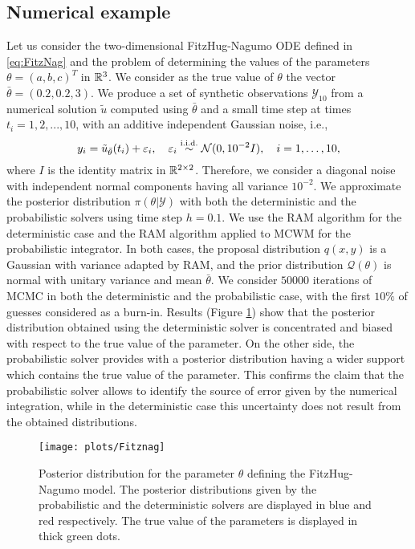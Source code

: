 \subsection{Numerical example}
Let us consider the two-dimensional FitzHug-Nagumo ODE defined in \eqref{eq:FitzNag} and the problem of determining the values of the parameters $\theta = (a, b, c)^T$ in $\mathbb{R}^3$. We consider as the true value of $\theta$ the vector $\bar \theta = (0.2, 0.2, 3)$. We produce a set of synthetic observations $\mathcal{Y}_{10}$ from a numerical solution $\tilde u$ computed using $\bar \theta$ and a small time step at times $t_i = 1, 2, ..., 10$, with an additive independent Gaussian noise, i.e.,
\begin{equation}
	y_i = \tilde u_{\bar\theta}(t_i) + \varepsilon_i, \quad \varepsilon_i \stackrel{\text{i.i.d.}}{\sim} \mathcal N (0, 10^{-2}I), \quad i = 1, \ldots, 10,
\end{equation}
where $I$ is the identity matrix in $\mathbb{R}^{2\times2}$. Therefore, we consider a diagonal noise with independent normal components having all variance $10^{-2}$. We approximate the posterior distribution $\pi(\theta|\mathcal Y)$ with both the deterministic and the probabilistic solvers using time step $h = 0.1$. We use the RAM algorithm for the deterministic case and the RAM algorithm applied to MCWM for the probabilistic integrator. In both cases, the proposal distribution $q(x,y)$ is a Gaussian with variance adapted by RAM, and the prior distribution $\mathcal{Q}(\theta)$ is normal with unitary variance and mean $\bar \theta$. We consider $50000$ iterations of MCMC in both the deterministic and the probabilistic case, with the first $10\%$ of guesses considered as a burn-in. Results (Figure \ref{fig:MCMC_FHN}) show that the posterior distribution obtained using the deterministic solver is concentrated and biased with respect to the true value of the parameter. On the other side, the probabilistic solver provides with a posterior distribution having a wider support which contains the true value of the parameter. This confirms the claim that the probabilistic solver allows to identify the source of error given by the numerical integration, while in the deterministic case this uncertainty does not result from the obtained distributions.

\begin{figure}
	\centering
	\texttt{[image: plots/Fitznag]}
	\caption{Posterior distribution for the parameter $\theta$ defining the FitzHug-Nagumo model. The posterior distributions given by the probabilistic and the deterministic solvers are displayed in blue and red respectively. The true value of the parameters is displayed in thick green dots.}
	\label{fig:MCMC_FHN}
\end{figure}